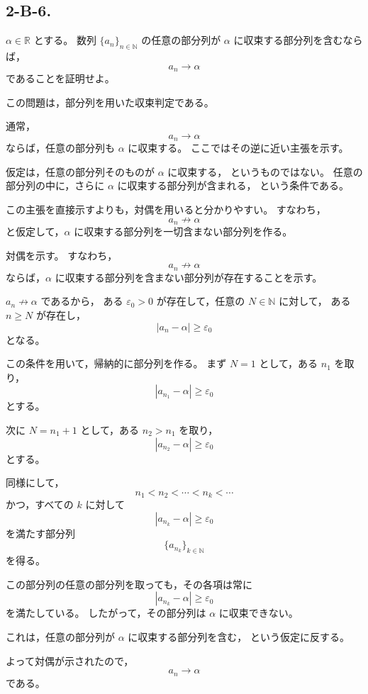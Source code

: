 \subsection{2-B-6.}
\begin{exercise}
	\(\alpha\in\mathbb{R}\) とする。
	数列 \(\{a_n\}_{n\in\mathbb{N}}\) の任意の部分列が
	\(\alpha\) に収束する部分列を含むならば，
	\[
	a_n\to\alpha
	\]
	であることを証明せよ。
\end{exercise}

\begin{background}
	この問題は，部分列を用いた収束判定である。
	
	通常，
	\[
	a_n\to\alpha
	\]
	ならば，任意の部分列も \(\alpha\) に収束する。
	ここではその逆に近い主張を示す。
	
	仮定は，任意の部分列そのものが \(\alpha\) に収束する，
	というものではない。
	任意の部分列の中に，さらに
	\(\alpha\) に収束する部分列が含まれる，
	という条件である。
	
	この主張を直接示すよりも，対偶を用いると分かりやすい。
	すなわち，
	\[
	a_n\not\to\alpha
	\]
	と仮定して，\(\alpha\) に収束する部分列を一切含まない部分列を作る。
\end{background}

\begin{strategy}
	対偶を示す。
	すなわち，
	\[
	a_n\not\to\alpha
	\]
	ならば，\(\alpha\) に収束する部分列を含まない部分列が存在することを示す。
	
	\(a_n\not\to\alpha\) であるから，
	ある \(\varepsilon_0>0\) が存在して，任意の \(N\in\mathbb{N}\) に対して，
	ある \(n\geq N\) が存在し，
	\[
	|a_n-\alpha|\geq \varepsilon_0
	\]
	となる。
	
	この条件を用いて，帰納的に部分列を作る。
	まず \(N=1\) として，ある \(n_1\) を取り，
	\[
	|a_{n_1}-\alpha|\geq\varepsilon_0
	\]
	とする。
	
	次に \(N=n_1+1\) として，ある \(n_2>n_1\) を取り，
	\[
	|a_{n_2}-\alpha|\geq\varepsilon_0
	\]
	とする。
	
	同様にして，
	\[
	n_1<n_2<\cdots<n_k<\cdots
	\]
	かつ，すべての \(k\) に対して
	\[
	|a_{n_k}-\alpha|\geq\varepsilon_0
	\]
	を満たす部分列
	\[
	\{a_{n_k}\}_{k\in\mathbb{N}}
	\]
	を得る。
	
	この部分列の任意の部分列を取っても，その各項は常に
	\[
	|a_{n_k}-\alpha|\geq\varepsilon_0
	\]
	を満たしている。
	したがって，その部分列は \(\alpha\) に収束できない。
	
	これは，任意の部分列が \(\alpha\) に収束する部分列を含む，
	という仮定に反する。
	
	よって対偶が示されたので，
	\[
	a_n\to\alpha
	\]
	である。
\end{strategy}